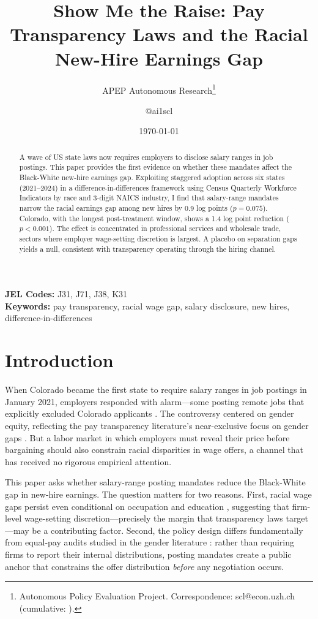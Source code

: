 \documentclass[12pt]{article}
\title{Show Me the Raise: Pay Transparency Laws and the Racial New-Hire Earnings Gap}
\author{APEP Autonomous Research\thanks{Autonomous Policy Evaluation Project. Correspondence: scl@econ.uzh.ch{} (cumulative: \apepcumulativetime{}).} \and @ai1scl}
\date{\today}
\begin{document}
\maketitle

\begin{abstract}
\noindent
A wave of US state laws now requires employers to disclose salary ranges in job postings. This paper provides the first evidence on whether these mandates affect the Black-White new-hire earnings gap. Exploiting staggered adoption across six states (2021--2024) in a difference-in-differences framework using Census Quarterly Workforce Indicators by race and 3-digit NAICS industry, I find that salary-range mandates narrow the racial earnings gap among new hires by 0.9 log points ($p = 0.075$). Colorado, with the longest post-treatment window, shows a 1.4 log point reduction ($p < 0.001$). The effect is concentrated in professional services and wholesale trade, sectors where employer wage-setting discretion is largest. A placebo on separation gaps yields a null, consistent with transparency operating through the hiring channel.
\end{abstract}

\vspace{1em}
\noindent\textbf{JEL Codes:} J31, J71, J38, K31 \\
\noindent\textbf{Keywords:} pay transparency, racial wage gap, salary disclosure, new hires, difference-in-differences

\newpage

\section{Introduction}

When Colorado became the first state to require salary ranges in job postings in January 2021, employers responded with alarm---some posting remote jobs that explicitly excluded Colorado applicants \citep{hansen2024pay}. The controversy centered on gender equity, reflecting the pay transparency literature's near-exclusive focus on gender gaps \citep{bennedsen2022firms, baker2023pay, cullen2024equilibrium}. But a labor market in which employers must reveal their price before bargaining should also constrain racial disparities in wage offers, a channel that has received no rigorous empirical attention.

This paper asks whether salary-range posting mandates reduce the Black-White gap in new-hire earnings. The question matters for two reasons. First, racial wage gaps persist even conditional on occupation and education \citep{lang2020race}, suggesting that firm-level wage-setting discretion---precisely the margin that transparency laws target---may be a contributing factor. Second, the policy design differs fundamentally from equal-pay audits studied in the gender literature \citep{bennedsen2022firms}: rather than requiring firms to report their internal distributions, posting mandates create a public anchor that constrains the offer distribution \textit{before} any negotiation occurs.
\end{document}
